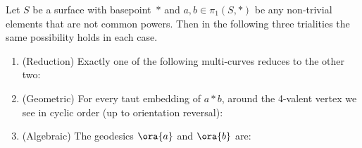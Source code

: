 \begin{theorem}\label{thm:crossings-triality}
  Let $S$ be a surface with basepoint~$*$ and $a,b \in \pi_1(S,*)$ be
  any non-trivial elements that are not common powers. Then in the
  following three trialities the same possibility holds in each case.
  \begin{enumerate}
  \item (Reduction) Exactly one of the following multi-curves reduces to the other two:\\
  \item (Geometric) For every taut embedding of $a * b$, around the
    4-valent vertex we see in cyclic
    order (up to orientation reversal):\\
  \item (Algebraic) The geodesics $\ora{a}$ and $\ora{b}$ are:\\
  \end{enumerate}
\end{theorem}

